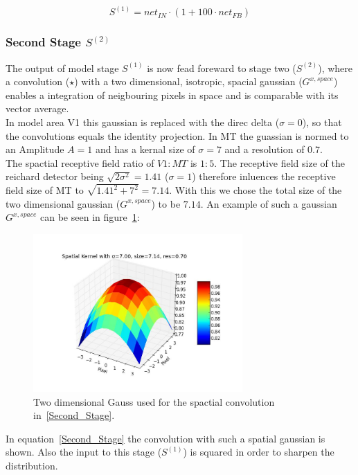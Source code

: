 \documentclass[a4paper]{article}
\begin{document}
\begin{equation}
S^{(1)}=net_{IN}\cdot(1+100\cdot net_{FB})
\label{First_Stage}
\end{equation}

\subsubsection{Second Stage $S^{(2)}$}
The output of model stage $S^{(1)}$ is now fead foreward to stage two ($S^{(2)}$), where a convolution ($\star$) with a two dimensional, isotropic, spacial gaussian ($G^{x,space}$) enables a integration of neigbouring pixels in space and is comparable with its vector average.\\
In model area V1 this gaussian is replaced with the direc delta ($\sigma=0$), so that the convolutions equals the identity projection. In MT the guassian is normed to an Amplitude $A=1$ and has a kernal size of $\sigma=7$ and a resolution of $0.7$.\\
The spactial receptive field ratio of $V1:MT$ is $1:5$. The receptive field size of the reichard detector being $\sqrt{2\sigma^{2}}=1.41$ ($\sigma=1$) therefore inluences the receptive field size of MT to $\sqrt{1.41^{2}+7^{2}}=7.14$. With this we chose the total size of the two dimensional gaussian ($G^{x,space}$) to be $7.14$.
An example of such a gaussian $G^{x,space}$ can be seen in figure~\ref{fig:spatialGauss}:

\vspace{0.5cm}
\begin{figure}[ht]
\centering
\includegraphics[width=8cm]{pics/spatialGauss}
\caption{Two dimensional Gauss used for the spactial convolution in~\eqref{Second_Stage}.}
\label{fig:spatialGauss}
\end{figure}
\vspace{0.5cm}

In equation~\eqref{Second_Stage} the convolution with such a spatial gaussian is shown. Also the input to this stage ($S^{(1)}$) is squared in order to sharpen the distribution.
\end{document}
